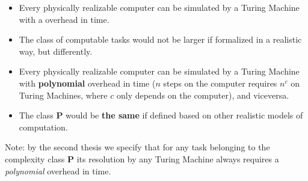 \begin{definition}[title = The Church-Turing Thesis]
    \begin{itemize}
        \renewcommand{\labelitemi}{-}
        \item Every physically realizable computer can be simulated by a Turing Machine with a overhead in time.
        \item The class of computable tasks would not be larger if formalized in a realistic way, but differently.
    \end{itemize}
\end{definition}
\begin{definition}[title = The Strong Church-Turing Thesis]
    \begin{itemize}
        \renewcommand{\labelitemi}{-}
        \item Every physically realizable computer can be simulated by a Turing Machine with \textbf{polynomial} overhead in time ($n$ steps on the computer requires $n^c$ on Turing Machines, where $c$ only depends on the computer), and viceversa.
        \item The class \textbf{P} would be \textbf{the same} if defined based on other realistic models of computation.
    \end{itemize}
\end{definition}

Note: by the second thesis we specify that for any task belonging to the complexity class \textbf{P} its resolution by any Turing Machine always requires
a \textit{polynomial} overhead in time.